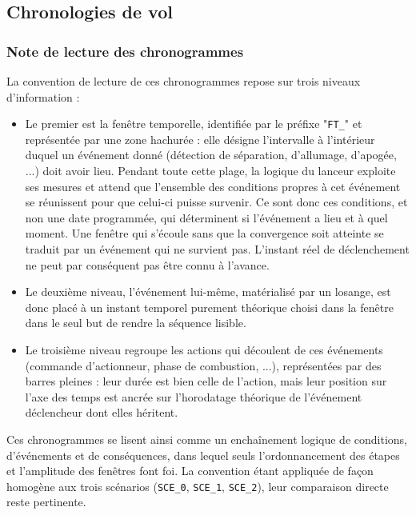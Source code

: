 \subsection{Chronologies de vol}

\subsubsection{Note de lecture des chronogrammes}

\noindent La convention de lecture de ces chronogrammes repose sur trois niveaux d'information :

\begin{itemize}
    \item Le premier est la fenêtre temporelle, identifiée par le préfixe "\texttt{FT\_}" et représentée par une zone hachurée :
    elle désigne l'intervalle à l'intérieur duquel un événement donné (détection de séparation, d'allumage, d'apogée, ...) doit
    avoir lieu. Pendant toute cette plage, la logique du lanceur exploite ses mesures et attend que l'ensemble des conditions
    propres à cet événement se réunissent pour que celui-ci puisse survenir. Ce sont donc ces conditions, et non une date
    programmée, qui déterminent si l'événement a lieu et à quel moment. Une fenêtre qui s'écoule sans que la convergence soit
    atteinte se traduit par un événement qui ne survient pas. L'instant réel de déclenchement ne peut par conséquent pas être
    connu à l'avance.\\

    \item Le deuxième niveau, l'événement lui-même, matérialisé par un losange, est donc placé à un instant temporel purement
    théorique choisi dans la fenêtre dans le seul but de rendre la séquence lisible.\\

    \item Le troisième niveau regroupe les actions qui découlent de ces événements (commande d'actionneur, phase de combustion,
    ...), représentées par des barres pleines : leur durée est bien celle de l'action, mais leur position sur l'axe des temps est
    ancrée sur l'horodatage théorique de l'événement déclencheur dont elles héritent.\\
\end{itemize}

Ces chronogrammes se lisent ainsi comme un enchaînement logique de conditions, d'événements et de conséquences, dans lequel seuls
l'ordonnancement des étapes et l'amplitude des fenêtres font foi. La convention étant appliquée de façon homogène aux trois
scénarios (\texttt{SCE\_0}, \texttt{SCE\_1}, \texttt{SCE\_2}), leur comparaison directe reste pertinente.

